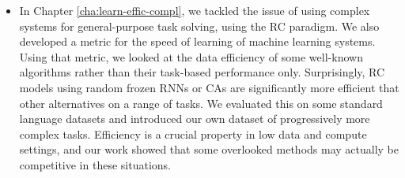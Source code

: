 \begin{itemize}
  \item In Chapter \ref{cha:learn-effic-compl}, we tackled the issue of using
        complex systems for general-purpose task solving, using the \ac{RC}
        paradigm. We also developed a metric for the speed of learning of
        machine learning systems. Using that metric, we looked at the data
        efficiency of some well-known algorithms rather than their task-based
        performance only. Surprisingly, \ac{RC} models using random frozen
        \acp{RNN} or \acp{CA} are significantly more efficient that other
        alternatives on a range of tasks. We evaluated this on some standard
        language datasets and introduced our own dataset of progressively more
        complex tasks. Efficiency is a crucial property in low data and compute
        settings, and our work showed that some overlooked methods may actually
        be competitive in these situations.
\end{itemize}
